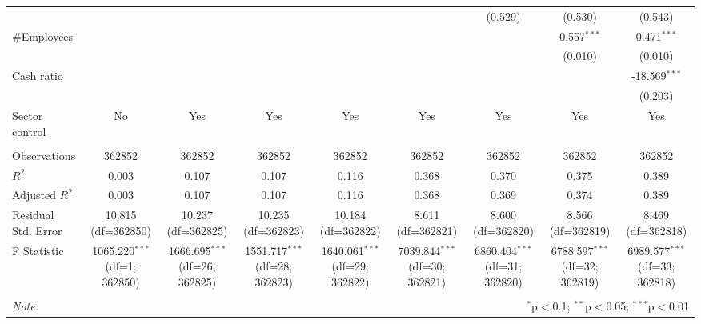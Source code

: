 \begin{table}[!htbp]
\begin{tabular}{@{\extracolsep{5pt}}lcccccccc}
& & & & & & (0.529) & (0.530) & (0.543) \\
 #Employees & & & & & & & 0.557$^{***}$ & 0.471$^{***}$ \\
& & & & & & & (0.010) & (0.010) \\
 Cash ratio & & & & & & & & -18.569$^{***}$ \\
& & & & & & & & (0.203) \\
 Sector control & No & Yes & Yes & Yes & Yes & Yes & Yes & Yes \\
\hline \\[-1.8ex]
 Observations & 362852 & 362852 & 362852 & 362852 & 362852 & 362852 & 362852 & 362852 \\
 $R^2$ & 0.003 & 0.107 & 0.107 & 0.116 & 0.368 & 0.370 & 0.375 & 0.389 \\
 Adjusted $R^2$ & 0.003 & 0.107 & 0.107 & 0.116 & 0.368 & 0.369 & 0.374 & 0.389 \\
 Residual Std. Error & 10.815 (df=362850) & 10.237 (df=362825) & 10.235 (df=362823) & 10.184 (df=362822) & 8.611 (df=362821) & 8.600 (df=362820) & 8.566 (df=362819) & 8.469 (df=362818) \\
 F Statistic & 1065.220$^{***}$ (df=1; 362850) & 1666.695$^{***}$ (df=26; 362825) & 1551.717$^{***}$ (df=28; 362823) & 1640.061$^{***}$ (df=29; 362822) & 7039.844$^{***}$ (df=30; 362821) & 6860.404$^{***}$ (df=31; 362820) & 6788.597$^{***}$ (df=32; 362819) & 6989.577$^{***}$ (df=33; 362818) \\
\hline
\hline \\[-1.8ex]
\textit{Note:} & \multicolumn{8}{r}{$^{*}$p$<$0.1; $^{**}$p$<$0.05; $^{***}$p$<$0.01} \\
\end{tabular}
\end{table}